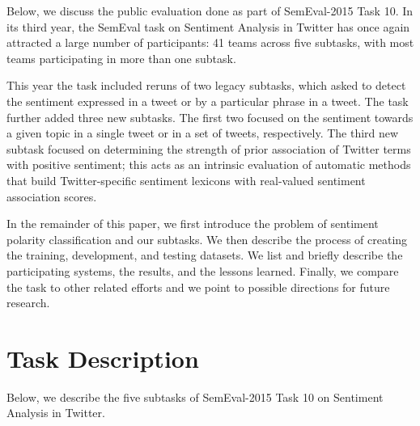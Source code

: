\documentclass[11pt]{article}
\begin{document}
Below, we discuss the public evaluation done as part of SemEval-2015 Task 10. In its third year, the SemEval task on Sentiment Analysis in Twitter has once again attracted a large number of participants: 41 teams across five subtasks, with most teams participating in more than one subtask.

This year the task included reruns of two legacy subtasks,
which asked to detect the sentiment expressed in a tweet or by a particular phrase in a tweet.
The task further added three new subtasks. The first two focused on the sentiment towards a given topic in a single tweet or in a set of tweets, respectively.
The third new subtask focused on determining the strength of prior association of Twitter terms with positive sentiment; this acts as an intrinsic evaluation of automatic methods that build Twitter-specific sentiment lexicons with real-valued sentiment association scores. 


In the remainder of this paper, we first introduce the problem of sentiment polarity classification and our subtasks. We then describe the process of creating the training, development, and testing datasets. We list and briefly describe the participating systems, the results, and the lessons learned. Finally, we compare the task to other related efforts and we point to possible directions for future research.

\section{Task Description}

Below, we describe the five subtasks of
SemEval-2015 Task 10 on Sentiment Analysis in Twitter.
\end{document}
